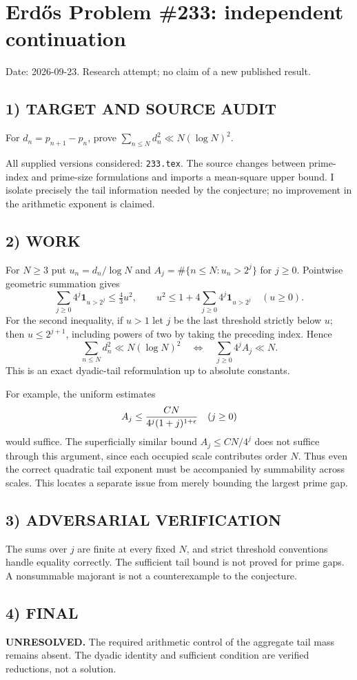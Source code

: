 \section{Erd\H{o}s Problem \#233: independent continuation}
\noindent Date: 2026-09-23. Research attempt; no claim of a new published result.
\subsection{1) TARGET AND SOURCE AUDIT}
For $d_n=p_{n+1}-p_n$, prove $\sum_{n\le N}d_n^2\ll N(\log N)^2$.

All supplied versions considered: \texttt{233.tex}.
The source changes between prime-index and prime-size formulations and imports a mean-square upper bound. I isolate precisely the tail information needed by the conjecture; no improvement in the arithmetic exponent is claimed.
\subsection{2) WORK}
For $N\ge3$ put $u_n=d_n/\log N$ and $A_j=\#\{n\le N:u_n>2^j\}$ for $j\ge0$. Pointwise geometric summation gives
\[
\sum_{j\ge0}4^j\mathbf1_{u>2^j}\le\tfrac43u^2,
\qquad
u^2\le1+4\sum_{j\ge0}4^j\mathbf1_{u>2^j}\quad(u\ge0).
\]
For the second inequality, if $u>1$ let $j$ be the last threshold strictly below $u$; then $u\le2^{j+1}$, including powers of two by taking the preceding index. Hence
\[
\sum_{n\le N}d_n^2\ll N(\log N)^2
\quad\Longleftrightarrow\quad
\sum_{j\ge0}4^j A_j\ll N.
\]
This is an exact dyadic-tail reformulation up to absolute constants.

For example, the uniform estimates
\[
A_j\le {CN\over4^j(1+j)^{1+\epsilon}}\quad(j\ge0)
\]
would suffice. The superficially similar bound $A_j\le CN/4^j$ does not suffice through this argument, since each occupied scale contributes order $N$. Thus even the correct quadratic tail exponent must be accompanied by summability across scales. This locates a separate issue from merely bounding the largest prime gap.
\subsection{3) ADVERSARIAL VERIFICATION}
The sums over $j$ are finite at every fixed $N$, and strict threshold conventions handle equality correctly. The sufficient tail bound is not proved for prime gaps. A nonsummable majorant is not a counterexample to the conjecture.
\subsection{4) FINAL}
\textbf{UNRESOLVED.}
The required arithmetic control of the aggregate tail mass remains absent. The dyadic identity and sufficient condition are verified reductions, not a solution.
